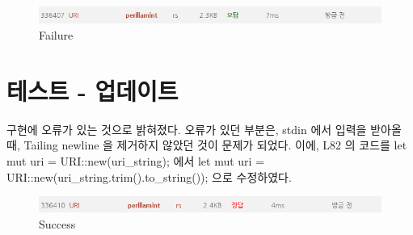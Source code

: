 \documentclass {article}
\begin{document}
\begin {figure}[h]
  \centering
  \includegraphics [width=120mm]{failure.png}
  \caption {Failure}
  \label{fig:failure}
\end {figure}

\section {테스트 - 업데이트}
구현에 오류가 있는 것으로 밝혀졌다. 오류가 있던 부분은, stdin 에서
입력을 받아올 때, Tailing newline 을 제거하지 않았던 것이 문제가 되었다.
이에, L82 의 코드를
\newline
\newline
let mut uri = URI::new(uri\_string);\newline
\newline
에서\newline
\newline
let mut uri = URI::new(uri\_string.trim().to\_string());\newline
\newline
으로 수정하였다.

\begin {figure}[h]
  \centering
  \includegraphics [width=120mm]{success.png}
  \caption {Success}
  \label{fig:success}
\end {figure}
\end{document}
